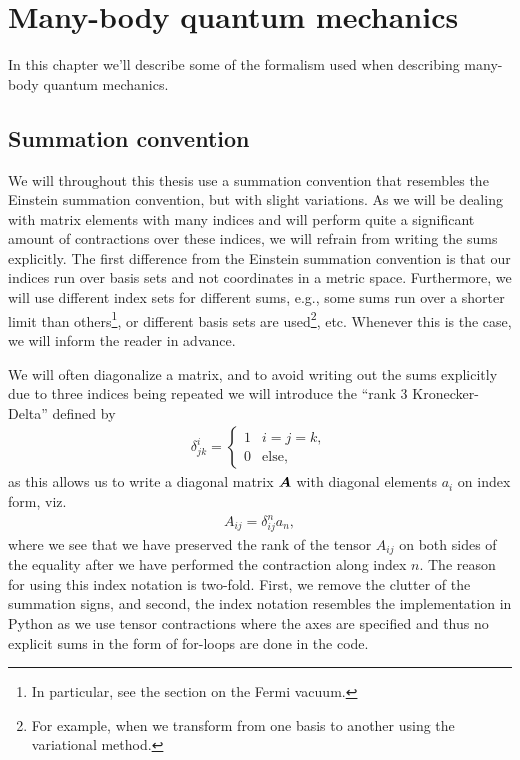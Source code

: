 \chapter{Many-body quantum mechanics}
    In this chapter we'll describe some of the formalism used when describing
    many-body quantum mechanics.

    \section{Summation convention}
        We will throughout this thesis use a summation convention that
        resembles the Einstein summation convention, but with slight
        variations.
        As we will be dealing with matrix elements with many indices and will
        perform quite a significant amount of contractions over these indices,
        we will refrain from writing the sums explicitly.
        The first difference from the Einstein summation convention is that our
        indices run over basis sets and not coordinates in a metric space.
        Furthermore, we will use different index sets for different sums, e.g.,
        some sums run over a shorter limit than others\footnote{%
            In particular, see the section on the Fermi vacuum.%
        }, or different basis sets are used\footnote{%
            For example, when we transform from one basis to another using the
            variational method.%
        }, etc.
        Whenever this is the case, we will inform the reader in advance.

        We will often diagonalize a matrix, and to avoid writing out the sums
        explicitly due to three indices being repeated we will introduce the
        ``rank 3 Kronecker-Delta'' defined by
        \begin{align}
            \delta^{i}_{jk} = \begin{cases}
                1 & i = j = k, \\
                0 & \text{else},
            \end{cases}
            \label{eq:rank-3-kd}
        \end{align}
        as this allows us to write a diagonal matrix $\boldsymbol{A}$ with diagonal
        elements $a_i$ on index form, viz.
        \begin{align}
            A_{ij} = \delta^{n}_{ij} a_{n},
        \end{align}
        where we see that we have preserved the rank of the tensor $A_{ij}$ on
        both sides of the equality after we have performed the contraction along
        index $n$.
        The reason for using this index notation is two-fold. First, we remove
        the clutter of the summation signs, and second, the index notation
        resembles the implementation in Python as we use tensor contractions
        where the axes are specified and thus no explicit sums in the form of
        for-loops are done in the code.

